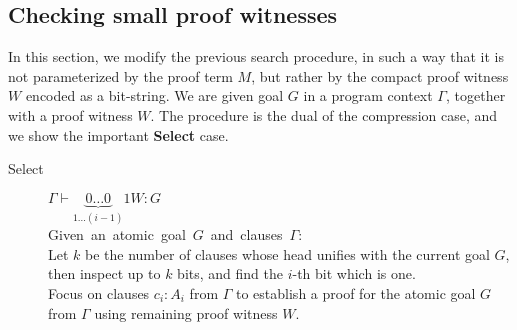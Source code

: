 \documentclass{llncs}
\newcommand{\figfoot}{\vspace{1ex}\hrule}
\newcommand{\fighead}{\hrule\vspace{1.5ex}}
\newcommand{\vd}{\vdash}
\begin{document}



\subsection{Checking small proof witnesses}
In this section, we modify the previous search procedure, in such a
way that it is not parameterized by the proof term $M$, but rather by
the compact proof witness $W$ encoded as a bit-string. We are given
goal $G$ in a program context $\Gamma$, together with a proof witness
$W$. The procedure is the dual of the compression case, and we show
the important \mbox{{\bf Select}} case.

\begin{small}
\begin{description}
\item[Select] $\Gamma \vd \underset{1 \ldots
    (i-1)}{\underbrace{0\ldots 0}}1
W : G $ \\
    \mbox{Given an atomic goal $G$ and clauses $\Gamma$:}\hfill\\
    Let $k$ be the number of clauses whose head unifies with the
    current goal $G$, then inspect up to $k$ bits, and
    find the $i$-th bit which is one. \\ 
    Focus on clauses $c_i : A_i$ from $\Gamma$ to establish a proof
    for the atomic goal $G$ from $\Gamma$ using remaining proof witness $W$.
\end{description}
\end{small}    
\end{document}

